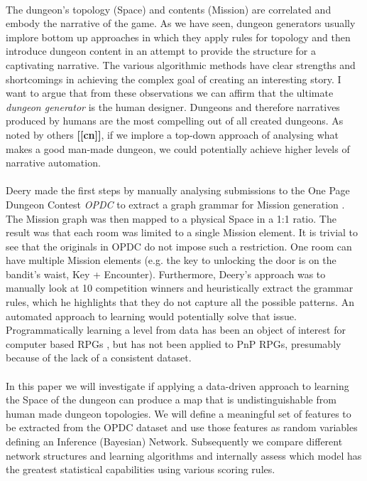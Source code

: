 \documentclass{UoYCSproject}
\begin{document}
\paragraph{}
The dungeon’s topology (Space) and contents (Mission) are correlated and embody the narrative of the game. As we have seen, dungeon generators usually implore bottom up approaches in which they apply rules for topology and then introduce dungeon content in an attempt to provide the structure for a captivating narrative. The various algorithmic methods have clear strengths and shortcomings in achieving the complex goal of creating an interesting story. I want to argue that from these observations we can affirm that the ultimate \textit{dungeon generator} is the human designer. Dungeons and therefore narratives produced by humans are the most compelling out of all created dungeons. As noted by others \textbf{[[cn]]}, if we implore a top-down approach of analysing what makes a good man-made dungeon, we could potentially achieve higher levels of narrative automation.
\paragraph{}
Deery made the first steps by manually analysing submissions to the One Page Dungeon Contest \textit{OPDC} \parencite{OPDC} to extract a graph grammar for Mission generation \parencite{Deery}. The Mission graph was then mapped to a physical Space in a 1:1 ratio. The result was that each room was limited to a single Mission element. It is trivial to see that the originals in OPDC do not impose such a restriction. One room can have multiple Mission elements (e.g. the key to unlocking the door is on the bandit’s waist, Key + Encounter). Furthermore, Deery’s approach was to manually look at 10 competition winners and heuristically extract the grammar rules, which he highlights that they do not capture all the possible patterns. An automated approach to learning would potentially solve that issue. Programmatically learning a level from data has been an object of interest for computer based RPGs \parencite{SummervilleLearningOfZelda}, but has not been applied to PnP RPGs, presumably because of the lack of a consistent dataset.

\paragraph{} %
In this paper we will investigate if applying a data-driven approach to learning the Space of the dungeon can produce a map that is undistinguishable from human made dungeon topologies. We will define a meaningful set of features to be extracted from the OPDC dataset and use those features as random variables defining an Inference (Bayesian) Network. Subsequently we compare different network structures and learning algorithms and internally assess which model has the greatest statistical capabilities using various scoring rules. %
\end{document}
